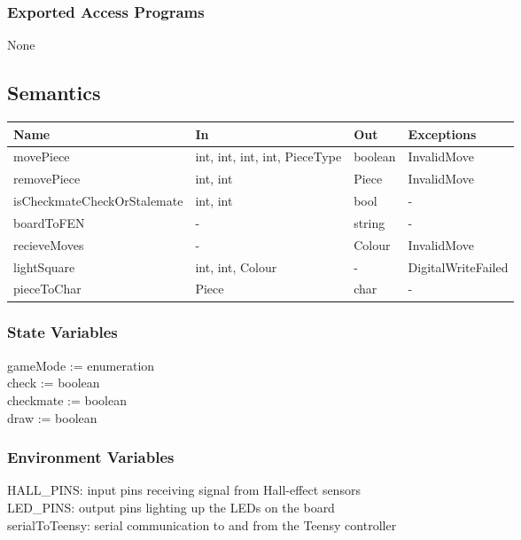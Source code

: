 \documentclass[12pt, titlepage]{article}
\begin{document}
\subsubsection{Exported Access Programs}{
  None
}

\subsection{Semantics}{
  \begin{center}
  \begin{tabular}{p{6cm} p{4cm} p{2cm} p{3cm}}
  \hline
  \textbf{Name} & \textbf{In} & \textbf{Out} & \textbf{Exceptions} \\
  \hline
  movePiece & {int, int, int, int, PieceType} & boolean & InvalidMove \\
  \midrule
  removePiece & {int, int} & Piece & InvalidMove \\
  \midrule
  isCheckmateCheckOrStalemate & {int, int} & bool & - \\
  \midrule
  boardToFEN & - & string & - \\
  \midrule
  recieveMoves & - & Colour & InvalidMove \\
  \midrule
  lightSquare & {int, int, Colour} & - & DigitalWriteFailed \\
  \midrule
  pieceToChar & Piece & char & - \\
  \hline
  \end{tabular}
  \end{center}
}

\subsubsection{State Variables}{
  gameMode := enumeration\\
  check := boolean\\
  checkmate := boolean\\
  draw := boolean\\
}

\subsubsection{Environment Variables}{
  HALL\_PINS: input pins receiving signal from Hall-effect sensors\\
  LED\_PINS: output pins lighting up the LEDs on the board\\
  serialToTeensy: serial communication to and from the Teensy controller\\
}
\end{document}
